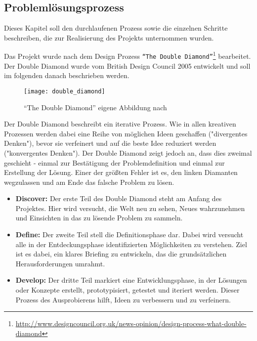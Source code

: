 \begin{newpage}
  \section{Problemlösungsprozess}
  \label{sec:problemlösungsprozess}
    Dieses Kapitel soll den durchlaufenen Prozess sowie die einzelnen Schritte beschreiben, die zur Realisierung des Projekts unternommen wurden. 

    Das Projekt wurde nach dem Design Prozess \texttt{"`The Double Diamond"'}\footnote{\url{http://www.designcouncil.org.uk/news-opinion/design-process-what-double-diamond}} bearbeitet. Der Double Diamond wurde vom British Design Council 2005 entwickelt und soll im folgenden danach beschrieben werden.\parencite{designcouncil}

    \begin{figure}[htbp]
      \begin{center}
        \texttt{[image: double\_diamond]}
        \caption{"`The Double Diamond"' eigene Abbildung nach \parencite{designcouncil}}
        \label{fig:double_diamond}
      \end{center}
    \end{figure}

    Der Double Diamond beschreibt ein iterative Prozess. Wie in allen kreativen Prozessen werden dabei eine Reihe von möglichen Ideen geschaffen ("divergentes Denken"), bevor sie verfeinert und auf die beste Idee reduziert werden ("konvergentes Denken"). Der Double Diamond zeigt jedoch an, dass dies zweimal geschieht - einmal zur Bestätigung der Problemdefinition und einmal zur Erstellung der Lösung. Einer der größten Fehler ist es, den linken Diamanten wegzulassen und am Ende das falsche Problem zu lösen.

    \begin{itemize}[label={}]
      \item \textbf{Discover:} Der erste Teil des Double Diamond steht am Anfang des Projektes. Hier wird versucht, die Welt neu zu sehen, Neues wahrzunehmen und Einsichten in das zu lösende Problem zu sammeln.

      \item \textbf{Define:} Der zweite Teil stell die Definitionsphase dar. Dabei wird versucht alle in der Entdeckungsphase identifizierten Möglichkeiten zu verstehen. Ziel ist es dabei, ein klares Briefing zu entwickeln, das die grundsätzlichen Herausforderungen umrahmt.

      \item \textbf{Develop:} Der dritte Teil markiert eine Entwicklungsphase, in der Lösungen oder Konzepte erstellt, prototypisiert, getestet und iteriert werden. Dieser Prozess des Ausprobierens hilft, Ideen zu verbessern und zu verfeinern.


\end{itemize}
\end{newpage}
